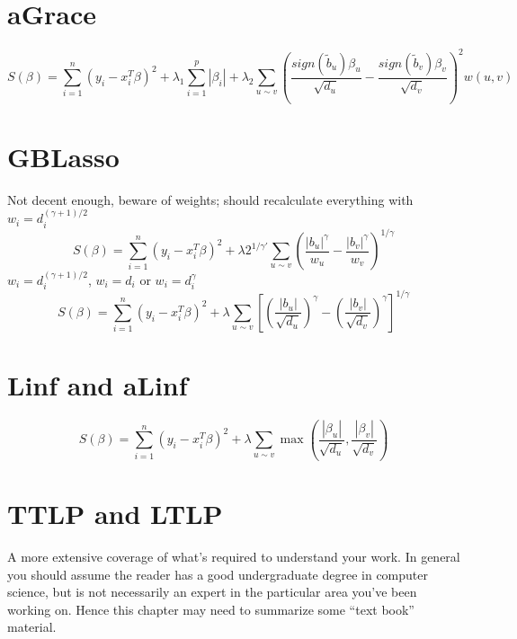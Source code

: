 \section{aGrace}
\begin{equation}
S(\beta) = \sum_{i=1}^{n} (y_i - x_i^T\beta)^2 + \lambda_1\sum_{i=1}^{p}\left|\beta_i\right| + \lambda_2\sum_{u \sim v}\left(\frac{sign(\tilde{b}_u)\beta_u}{\sqrt{d_u}}-\frac{sign(\tilde{b}_v)\beta_v}{\sqrt{d_v}}\right)^2w(u,v)
\end{equation}


\section{GBLasso}
Not decent enough, beware of weights; should recalculate everything with $w_i = d_i^{(\gamma+1)/2}$ 
\begin{equation}
S(\beta) = \sum_{i=1}^{n} (y_i - x_i^T\beta)^2 + \lambda2^{1/\gamma'}\sum_{u \sim v}\left(\frac{|b_u|^\gamma}{w_u}-\frac{|b_v|^\gamma}{w_v}\right)^{1/\gamma}
\end{equation}
$w_i = d_i^{(\gamma+1)/2}$, $w_i = d_i$ or $w_i = d_i^\gamma$ 
\begin{equation}
S(\beta) = \sum_{i=1}^{n} (y_i - x_i^T\beta)^2 + 
\lambda\sum_{u \sim v}
\left[\left(\frac{|b_u|}{\sqrt{d_u}}\right)^\gamma-
\left(\frac{|b_v|}{\sqrt{d_v}}\right)^\gamma\right]^{1/\gamma}
\end{equation}



\section{Linf and aLinf}
\begin{equation}
S(\beta) = \sum_{i=1}^{n} (y_i - x_i^T\beta)^2 + 
\lambda\sum_{u \sim v}\max\left(\frac{|\beta_u|}{\sqrt{d_u}},\frac{|\beta_v|}{\sqrt{d_v}}\right)
\end{equation}

\section{TTLP and LTLP}


\newpage

A more extensive coverage of what's required to understand your 
work. In general you should assume the reader has a good undergraduate 
degree in computer science, but is not necessarily an expert in 
the particular area you've been working on. Hence this chapter 
may need to summarize some ``text book'' material. 

